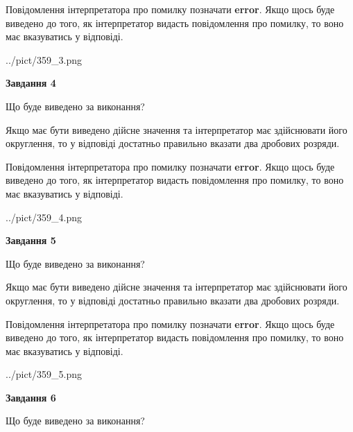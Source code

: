 \documentclass[12pt, ukrainian]{article}
\begin{document}
{\begin {Large}
Повідомлення інтерпретатора про помилку позначати \textbf{error}.
Якщо щось буде виведено до того, як інтерпретатор видасть повідомлення про помилку, 
то воно має вказуватись у відповіді. \par

\begin{center}
	{../pict/359_3.png}
\end{center}
\newpage

{\begin {center}\textbf{Завдання 4}\end {center}}\par
Що буде виведено за виконання? \par

Якщо має бути виведено дійсне значення та інтерпретатор має здійснювати його округлення, 
то у відповіді достатньо правильно вказати два дробових розряди.

Повідомлення інтерпретатора про помилку позначати \textbf{error}.
Якщо щось буде виведено до того, як інтерпретатор видасть повідомлення про помилку, 
то воно має вказуватись у відповіді. \par

\begin{center}
	{../pict/359_4.png}
\end{center}
\newpage

{\begin {center}\textbf{Завдання 5}\end {center}}\par
Що буде виведено за виконання? \par

Якщо має бути виведено дійсне значення та інтерпретатор має здійснювати його округлення, 
то у відповіді достатньо правильно вказати два дробових розряди.

Повідомлення інтерпретатора про помилку позначати \textbf{error}.
Якщо щось буде виведено до того, як інтерпретатор видасть повідомлення про помилку, 
то воно має вказуватись у відповіді. \par

\begin{center}
	{../pict/359_5.png}
\end{center}
\newpage

{\begin {center}\textbf{Завдання 6}\end {center}}\par
Що буде виведено за виконання? \par


\end{Large}}
\end{document}

